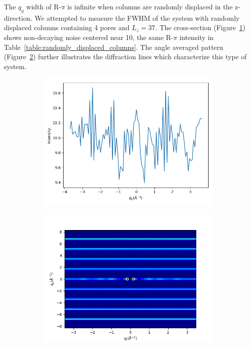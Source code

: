 \documentclass{article}
\begin{document}
  The $q_y$ width of R-$\pi$ is infinite when columns are randomly displaced in
  the z-direction. We attempted to measure the FWHM of the system with randomly
  displaced columns containing 4 pores and $L_z = 37$. The cross-section
  (Figure~\ref{fig:random_columns_qy}) shows non-decaying noise centered near 10,
  the same R-$\pi$ intensity in Table~\ref{table:randomly_displaced_columns}. The 
  angle averaged pattern (Figure~\ref{fig:random_columns_rzplot}) further illustrates
  the diffraction lines which characterize this type of system.

  \begin{figure}[!htb]
  \centering
  \begin{subfigure}{0.45\textwidth}
  \includegraphics[width=\textwidth]{random_columns_qy.png}
  \caption{}\label{fig:random_columns_qy}
  \end{subfigure}
  \begin{subfigure}{0.45\textwidth}
  \includegraphics[width=\textwidth]{random_columns_rzplot.png}
  \caption{}\label{fig:random_columns_rzplot}
  \end{subfigure}
  \caption{}\label{fig:random_columns_rpi_width}
  \end{figure}
\end{document}
